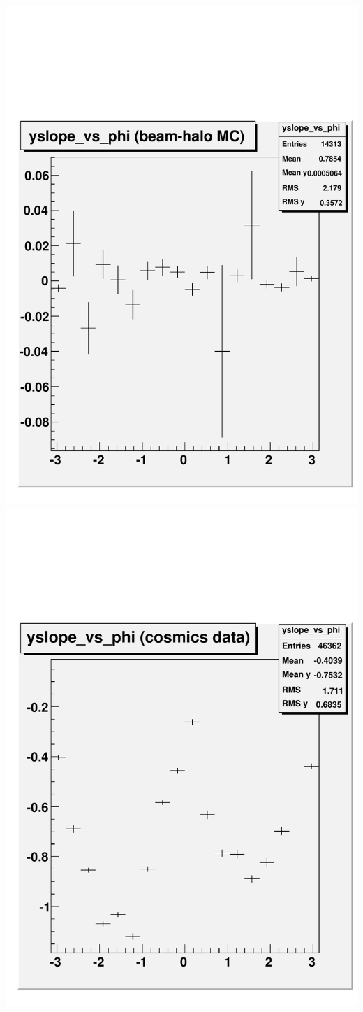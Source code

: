 \documentclass[compress]{beamer}
\begin{document}
\begin{frame}
\begin{columns}
\includegraphics[width=0.5\linewidth]{MC_yslope_vs_phi.pdf}
\includegraphics[width=0.5\linewidth]{data_yslope_vs_phi.pdf}
\end{columns}
\end{frame}
\end{document}
